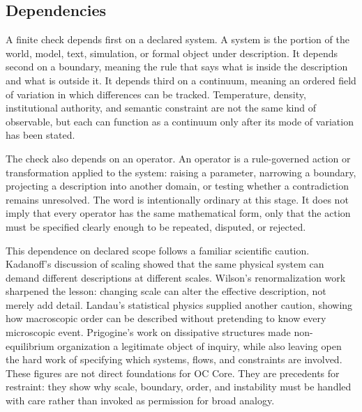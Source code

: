 \documentclass[11pt,a4paper,openany]{book}
\begin{document}
\subsection{Dependencies}
A finite check depends first on a declared system. A system is the portion of the world, model, text, simulation, or formal object under description. It depends second on a boundary, meaning the rule that says what is inside the description and what is outside it. It depends third on a continuum, meaning an ordered field of variation in which differences can be tracked. Temperature, density, institutional authority, and semantic constraint are not the same kind of observable, but each can function as a continuum only after its mode of variation has been stated. \cite{kadanoff_scaling,wilson_renormalization}\par
The check also depends on an operator. An operator is a rule-governed action or transformation applied to the system: raising a parameter, narrowing a boundary, projecting a description into another domain, or testing whether a contradiction remains unresolved. The word is intentionally ordinary at this stage. It does not imply that every operator has the same mathematical form, only that the action must be specified clearly enough to be repeated, disputed, or rejected.\par
This dependence on declared scope follows a familiar scientific caution. Kadanoff's discussion of scaling showed that the same physical system can demand different descriptions at different scales. Wilson's renormalization work sharpened the lesson: changing scale can alter the effective description, not merely add detail. Landau's statistical physics supplied another caution, showing how macroscopic order can be described without pretending to know every microscopic event. Prigogine's work on dissipative structures made non-equilibrium organization a legitimate object of inquiry, while also leaving open the hard work of specifying which systems, flows, and constraints are involved. These figures are not direct foundations for OC Core. They are precedents for restraint: they show why scale, boundary, order, and instability must be handled with care rather than invoked as permission for broad analogy.\par
\end{document}
